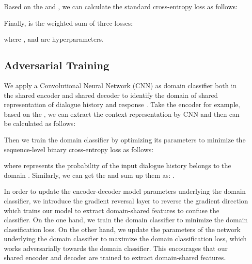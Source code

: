 \documentclass[11pt,a4paper]{article}
\begin{document}
Based on the  and , we can calculate the standard cross-entropy loss  as follows:


Finally,  is the weighted-sum of three losses:

where ,  and  are hyperparameters.

\subsection{Adversarial Training}
We apply a Convolutional Neural Network (CNN) as domain classifier both in the shared encoder and shared decoder to identify the domain of shared representation of dialogue history  and response . Take the encoder for example, based on the , we can extract the context representation  by CNN and then  can be calculated as follows:


Then we train the domain classifier by optimizing its parameters  to minimize the sequence-level binary cross-entropy loss  as follows:

where  represents the probability of the input dialogue history belongs to the domain . Similarly, we can get the  and sum up them as: .

In order to update the encoder-decoder model parameters  underlying the domain classifier, we introduce the gradient reversal layer to reverse the gradient direction which trains our model to extract domain-shared features to confuse the classifier. On the one hand, we train the domain classifier to minimize the domain classification loss. On the other hand, we update the parameters of the network underlying the domain classifier to maximize the domain classification loss, which works adversarially towards the domain classifier. This encourages that our shared encoder and decoder are trained to extract domain-shared features. 
\end{document}
